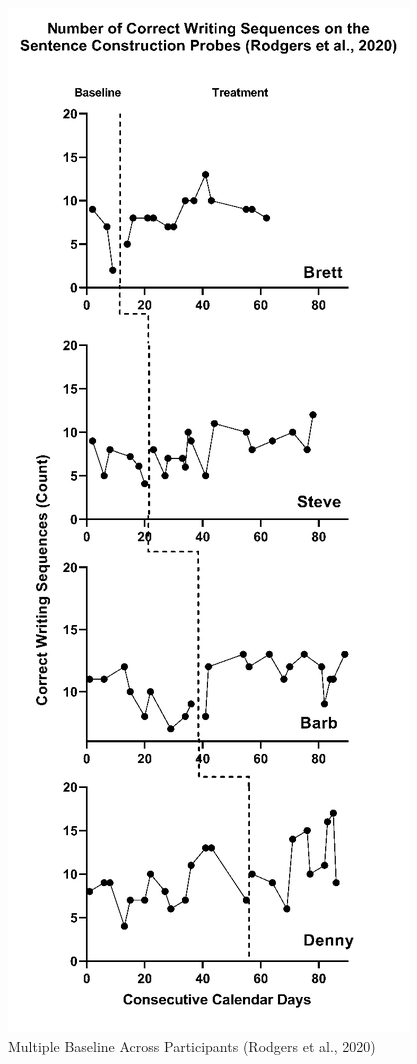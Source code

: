 \documentclass[
]{book}
\begin{document}
\begin{figure}
\includegraphics[width=0.75\linewidth]{images/Rodgers-2020} \caption{Multiple Baseline Across Participants (Rodgers et al., 2020)}\label{fig:Rodgers-2020}
\end{figure}
\end{document}
